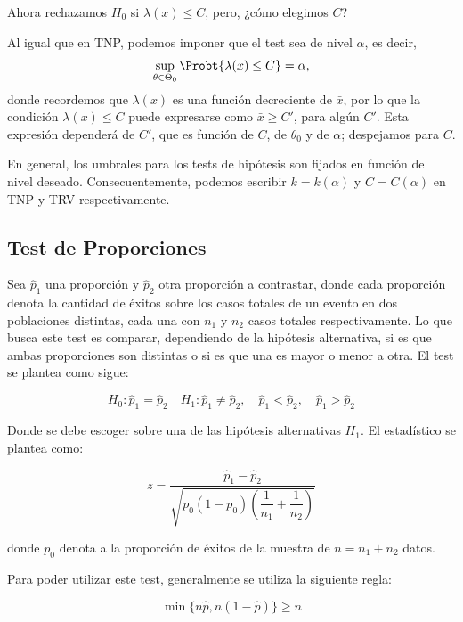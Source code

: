 \begin{example}
Ahora rechazamos $H_0$ si $\lambda(x)\leq C$, pero, ¿cómo elegimos $C$?

Al igual que en TNP, podemos imponer que el test sea de nivel $\alpha$, es decir, 
\begin{equation}
 	\sup_{\theta\in\Theta_0} \Probt{\lambda(x)\leq C} = \alpha,
 \end{equation} 
 donde recordemos que $\lambda(x)$ es una función decreciente de $\bar{x}$, por lo que la condición $\lambda(x)\leq C$ puede expresarse como $\bar{x}\geq C'$, para algún $C'$. Esta expresión dependerá de $C'$, que es función de $C$, de $\theta_0$ y de $\alpha$; despejamos para $C$.
 
 \end{example} 
 
 \begin{remark}
     En general, los umbrales para los tests de hipótesis son fijados en función del nivel deseado. Consecuentemente, podemos escribir $k=k(\alpha)$ y $C=C(\alpha)$ en TNP y TRV respectivamente. 
 \end{remark}
 
\subsection{Test de Proporciones}

Sea $\hat{p}_1$ una proporción y $\hat{p}_2$ otra proporción a contrastar, donde cada proporción denota la cantidad de éxitos sobre los casos totales de un evento en dos poblaciones distintas, cada una con $n_1$ y $n_2$ casos totales respectivamente. Lo que busca este test es comparar, dependiendo de la hipótesis alternativa, si es que ambas proporciones son distintas o si es que una es mayor o menor a otra. El test se plantea como sigue:

$$
H_0:\hat{p}_1=\hat{p}_2 \quad H_1:\hat{p}_1\neq \hat{p}_2,\quad \hat{p}_1<\hat{p}_2,\quad \hat{p}_1>\hat{p}_2 
$$

Donde se debe escoger sobre una de las hipótesis alternativas $H_1$. El estadístico se plantea como:

$$
z = \dfrac{\hat{p}_1-\hat{p}_2}{\sqrt{p_0(1-p_0)\left ( \dfrac{1}{n_1}+\dfrac{1}{n_2}\right)}}
$$

donde $p_0$ denota a la proporción de éxitos de la muestra de $n=n_1+n_2$ datos.

Para poder utilizar este test, generalmente se utiliza la siguiente regla:

$$
\min{\{n\hat{p}, n(1-\hat{p})\}}\geq n
$$

